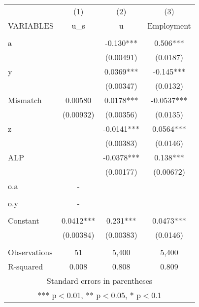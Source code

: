 \documentclass[]{article}
\begin{document}
\begin{tabular}{lccc} \hline
 & (1) & (2) & (3) \\
VARIABLES & u\_s & u & Employment \\ \hline
 &  &  &  \\
a &  & -0.130*** & 0.506*** \\
 &  & (0.00491) & (0.0187) \\
y &  & 0.0369*** & -0.145*** \\
 &  & (0.00347) & (0.0132) \\
Mismatch & 0.00580 & 0.0178*** & -0.0537*** \\
 & (0.00932) & (0.00356) & (0.0135) \\
z &  & -0.0141*** & 0.0564*** \\
 &  & (0.00383) & (0.0146) \\
ALP &  & -0.0378*** & 0.138*** \\
 &  & (0.00177) & (0.00672) \\
o.a & - &  &  \\
 &  &  &  \\
o.y & - &  &  \\
 &  &  &  \\
Constant & 0.0412*** & 0.231*** & 0.0473*** \\
 & (0.00384) & (0.00383) & (0.0146) \\
 &  &  &  \\
Observations & 51 & 5,400 & 5,400 \\
 R-squared & 0.008 & 0.808 & 0.809 \\ \hline
\multicolumn{4}{c}{ Standard errors in parentheses} \\
\multicolumn{4}{c}{ *** p$<$0.01, ** p$<$0.05, * p$<$0.1} \\
\end{tabular}
\end{document}
